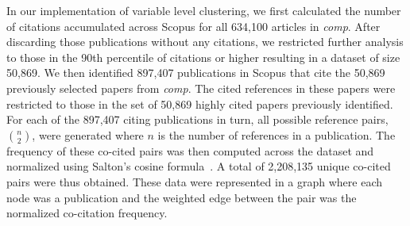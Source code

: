 In our implementation of variable level clustering, we first calculated the number of citations accumulated across Scopus for all 634,100 articles in \emph{comp}. After discarding those publications without any citations, we restricted further analysis to those in the 90th percentile of citations or higher resulting in a dataset of size 50,869. We then identified 897,407 publications in Scopus that cite the 50,869 previously selected papers from \emph{comp}. The cited references in these papers were restricted to those in the set of 50,869 highly cited papers previously identified. For each of the 897,407 citing publications in turn, all possible reference pairs, ${n \choose 2}$, were generated where $n$ is the number of references in a publication. The frequency of these co-cited pairs was then computed across the dataset  and normalized using Salton's cosine formula~\cite{salton_citation_1979}. A total of 2,208,135 unique co-cited pairs were thus obtained. These data were represented in a graph where each node was a publication and the weighted edge between the pair was the normalized co-citation frequency. \par

